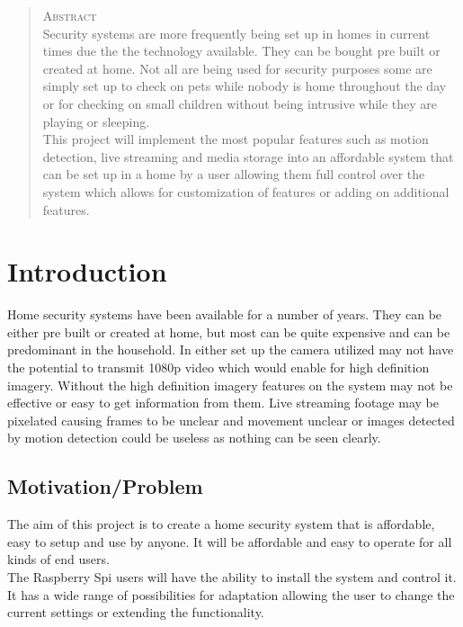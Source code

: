 \documentclass[12pt]{report}
\begin{document}
\begin{abstract}
\textsc{\huge Abstract}  \\[1.0cm]
Security systems are more frequently being set up in homes in current times due the the technology available. They can be bought pre built or created at home. Not all are being used for security purposes some are simply set up to check on pets while nobody is home throughout the day or for checking on small children without being intrusive while they are playing or sleeping.\\

This project will implement the most popular features such as motion detection, live streaming and media storage into an affordable system that can be set up  in a home by a user allowing them full control over the system which allows for customization of features or adding on additional features.\\
\end{abstract}

\tableofcontents
\chapter{Introduction}
\label{ch:intro} 

Home security systems have been available for a number of years. They can be either pre built or created at home, but most can be quite expensive and can be predominant in the household. In either set up the camera utilized may not have the potential to transmit 1080p video which would enable for high deﬁnition imagery. Without the high deﬁnition imagery features on the system may not be effective or easy to get information from them. Live streaming footage may be pixelated causing frames to be unclear and movement unclear or images detected by motion detection could be useless as nothing can be seen clearly.

\section{Motivation/Problem}
\label{sec:motprob}
The aim of this project is to create a home security system that is affordable, easy to setup and use by anyone. It will be affordable and easy to operate for all kinds of end users.\\

The Raspberry Spi  users will have the ability to install the system and control it.  It has a wide range of possibilities for adaptation allowing the user to change the current settings or extending the functionality.\\
\end{document}
